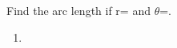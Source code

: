Find the arc length if r= and $\theta$=\degree.
\newline
\begin{enumerate}
    \item
    \degree
{}
\end{enumerate}
